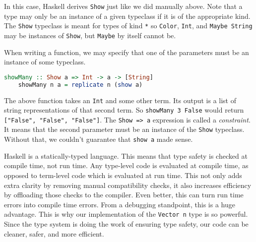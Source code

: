 \documentclass[MS, xcolor=dvipsnames]{wfuthesis}
\theoremstyle{definition}
\begin{document}
In this case, Haskell derives \lstinline{Show} just like we did manually above. Note that a type may only be an instance of a given typeclass if it is of the appropriate kind. The \lstinline{Show} typeclass is meant for types of kind \lstinline{*} so \lstinline{Color}, \lstinline{Int}, and \lstinline{Maybe String} may be instances of \lstinline{Show}, but \lstinline{Maybe} by itself cannot be. \par
When writing a function,  we may specify that one of the parameters must be an instance of some typeclass.
\begin{lstlisting}[language=Haskell]
showMany :: Show a => Int -> a -> [String]
    showMany n a = replicate n (show a)
\end{lstlisting}
The above function takes an \lstinline{Int} and some other term. Its output is a list of string representations of that second term. So \lstinline{showMany 3 False} would return \lstinline{["False", "False", "False"]}. The \lstinline{Show => a} expression is called a \emph{constraint}. It means that the second parameter must be an instance of the \lstinline{Show} typeclass. Without that, we couldn't guarantee that \lstinline{show a} made sense. \par
Haskell is a statically-typed language. This means that type safety is checked at compile time, not run time. Any type-level code is evaluated at compile time, as opposed to term-level code which is evaluated at run time. This not only adds extra clarity by removing manual compatibility checks, it also increases efficiency by offloading those checks to the compiler. Even better, this can turn run time errors into compile time errors. From a debugging standpoint, this is a huge advantage. This is why our implementation of the \lstinline{Vector n} type is so powerful. Since the type system is doing the work of ensuring type safety, our code can be cleaner, safer, and more efficient.

\end{document}
